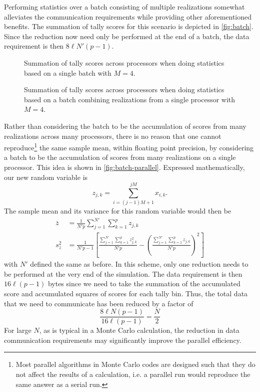 Performing statistics over a batch consisting of multiple realizations somewhat
alleviates the communication requirements while providing other aforementioned
benefits. The summation of tally scores for this scenario is depicted in
\autoref{fig:batch}. Since the reduction now need only be performed at the end
of a batch, the data requirement is then $8\ell N' (p-1)$.
\begin{figure}[ht]
  \centering
  \def\svgwidth{2in}
  
  \caption{Summation of tally scores across processors when doing statistics
    based on a single batch with $M=4$.}
  \label{fig:batch}
\end{figure}

\begin{figure}[bht]
  \centering
  \def\svgwidth{2in}
  
  \caption{Summation of tally scores across processors when doing statistics
    based on a batch combining realizations from a single processor with $M=4$.}
  \label{fig:batch-parallel}
\end{figure}
Rather than considering the batch to be the accumulation of scores from many
realizations across many processors, there is no reason that one cannot
reproduce\footnote{Most parallel algorithms in Monte Carlo codes are designed
  such that they do not affect the results of a calculation, i.e. a parallel run
  would reproduce the same answer as a serial run.} the same sample mean, within
floating point precision, by considering a batch to be the accumulation of
scores from many realizations on a single processor. This idea is shown in
\autoref{fig:batch-parallel}. Expressed mathematically, our new random variable
is
\begin{equation}
  z_{j,k} = \sum_{i=(j-1)M + 1}^{jM} x_{i,k}.
\end{equation}
The sample mean and its variance for this random variable would then be
\begin{align}
  \bar{z} &= \frac{1}{N'p} \sum_{j=1}^{N'} \sum_{k=1}^p z_{j,k} \\ s^2_{\bar{z}}
  &= \frac{1}{N'p-1} \left [ \frac{\sum_{j=1}^{N'} \sum_{k=1}^p z_{j,k}^2}{N'p}
    - \left ( \frac{\sum_{j=1}^{N'} \sum_{k=1}^p z_{j,k}}{N'p} \right )^2 \right
  ]
\end{align}
with $N'$ defined the same as before. In this scheme, only one reduction needs
to be performed at the very end of the simulation. The data requirement is then
$16\ell(p-1)$ bytes since we need to take the summation of the accumulated score
and accumulated squares of scores for each tally bin. Thus, the total data that
we need to communicate has been reduced by a factor of
\begin{equation}
  \frac{8\ell N(p-1)}{16\ell (p-1)} = \frac{N}{2}
\end{equation}
For large $N$, as is typical in a Monte Carlo calculation, the reduction in data
communication requirements may significantly improve the parallel efficiency.
  

